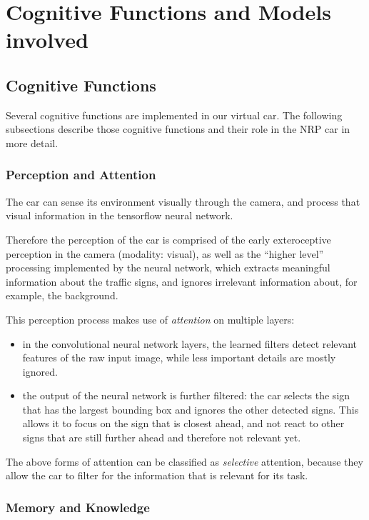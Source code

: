 
\section{Cognitive Functions and Models involved}

\subsection{Cognitive Functions}
Several cognitive functions are implemented in our virtual car. 
The following subsections describe those cognitive functions and their role in the NRP car in more detail.

\subsubsection{Perception and Attention}
The car can sense its environment visually through the camera, and process that visual information in the tensorflow neural network.

Therefore the perception of the car is comprised of the early exteroceptive perception in the camera (modality: visual), as well as the ``higher level'' processing implemented by the neural network, which extracts meaningful information about the traffic signs, and ignores irrelevant information about, for example, the background. 

This perception process makes use of \emph{attention} on multiple layers:
\begin{itemize}
 \item in the convolutional neural network layers, the learned filters detect relevant features of the raw input image, while less important details are mostly ignored.
 \item the output of the neural network is further filtered: the car selects the sign that has the largest bounding box and ignores the other detected signs. This allows it to focus on the sign that is closest ahead, and not react to other signs that are still further ahead and therefore not relevant yet. 
\end{itemize}
The above forms of attention can be classified as \emph{selective} attention, because they allow the car to filter for the information that is relevant for its task.

\subsubsection{Memory and Knowledge}

